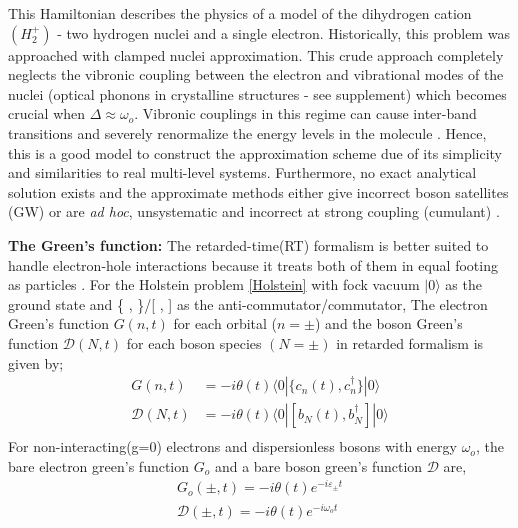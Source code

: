 \documentclass[%
 reprint,
 amsmath,amssymb,
 aps,prl,
floatfix
]{revtex4-2}
\begin{document}
This Hamiltonian describes the physics of a model of the dihydrogen cation $(H_2^+)$ - two hydrogen nuclei and a single electron. Historically, this problem was approached with clamped nuclei approximation. This crude approach completely neglects the vibronic coupling between the electron and vibrational modes of the nuclei (optical phonons in crystalline structures - see supplement) which becomes crucial when $\Delta \approx \omega_o$. Vibronic couplings in this regime can cause inter-band transitions and severely renormalize the energy levels in the molecule \cite{heller_molecular_1979,heller_molecular_1980, ranninger_two-site_1992}. Hence, this is a good model to construct the approximation scheme due of its simplicity and similarities to real multi-level systems. Furthermore, no exact analytical solution exists and the approximate methods either give incorrect boson satellites (GW) or are {\it ad hoc}, unsystematic and incorrect at strong coupling (cumulant) \cite{gunnarsson_corrections_1994}. 

\textbf{The Green's function:}
The retarded-time(RT) formalism is better suited to handle electron-hole interactions because it treats both of them in equal footing as particles \cite{kas_cumulant_2014}. For the Holstein problem \eqref{Holstein} with fock vacuum $|0\rangle$ as the ground state and \{ , \}/[ , ] as the anti-commutator/commutator, The electron Green's function $G(n,t)$ for each orbital ($n=\pm$) and the boson Green's function $\mathcal{D}(N,t)$ for each boson species $(N =\pm)$ in retarded formalism is given by;
\begin{equation}
\begin{aligned}
    G(n,t) &= -i \theta(t)\langle 0|\{c_n(t) ,{c_n^{\dagger}}\}|0\rangle\\
    \mathcal{D}(N,t) &= -i \theta(t)\langle 0|[b_N(t) ,{b_N^{\dagger}}]|0\rangle\\
\end{aligned}
\label{Greens definition}
\end{equation}
For non-interacting(g=0) electrons and dispersionless bosons with energy $\omega_o$, the bare electron green's function $G_o$ and a bare boson green's function $\mathcal{D}$ are,
\begin{equation}
\begin{aligned}
G_o(\pm,t) = -i\theta(t) e^{-i\varepsilon_\pm t} \\ \mathcal{D}(\pm,t) = -i\theta(t)e^{-i\omega_o t}
\end{aligned}
\label{Bare electron and boson greens and greens}
\end{equation}
\end{document}
